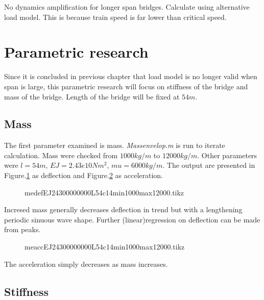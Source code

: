 No dynamics amplification for longer span bridges. Calculate using alternative load model. This is because train speed is far lower than critical speed.

\section{Parametric research}
Since it is concluded in previous chapter that load model is no longer valid when 
span is large, this parametric research will focus on stiffness of the bridge and mass of the bridge. Length of the bridge will be fixed at $54m$.

\subsection{Mass}

The first parameter examined is mass. \textit{Massenvelop.m} is run to iterate calculation. Mass were checked from $1000kg/m$ to $12000kg/m$. Other parameters were $l=54m$, $EJ=2.43e10Nm^2$, $mu=6000kg/m$. The output are presented in Figure.\ref{fig:medefEJ24300000000L54c14min1000max12000} as deflection and Figure.\ref{fig:meaccEJ24300000000L54c14min1000max12000} as acceleration.


\begin{figure}[h!]
\centering 
\setlength\figureheight{6cm} 
\setlength\figurewidth{6cm} 
 
\caption{medefEJ24300000000L54c14min1000max12000.tikz} 
\label{fig:medefEJ24300000000L54c14min1000max12000} 
\end{figure}

Incresed mass generally decreases deflection in trend but with a lengthening periodic sinuous wave shape. Further (linear)regression on deflection can be made from peaks.

\begin{figure}[h!]
\centering 
\setlength\figureheight{6cm} 
\setlength\figurewidth{6cm} 
 
\caption{meaccEJ24300000000L54c14min1000max12000.tikz} 
\label{fig:meaccEJ24300000000L54c14min1000max12000} 
\end{figure}

The acceleration simply decreases as mass increases.

\subsection{Stiffness}

